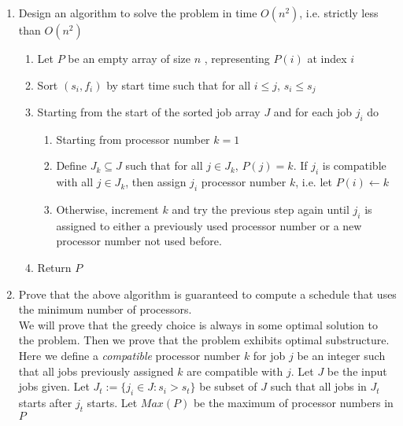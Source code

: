 \documentclass[11pt]{article}
\begin{document}
\begin{enumerate}
  \item Design an algorithm to solve the problem in time $O(n^2)$, i.e. strictly less than $O(n^2)$\\
  \begin{enumerate}
    \item Let $P$ be an empty array of size $n$ , representing $P(i)$ at index $i$
    \item Sort $(s_i, f_i)$ by start time such that for all $i\leq j$, $s_i \leq s_j$
    \item Starting from the start of the sorted job array $J$ and for each job $j_i$ do
    \begin{enumerate}
      \item Starting from processor number $k = 1$
      \item Define $J_k\subseteq J$ such that for all $j\in J_k$, $P(j) = k$. If $j_i$ is compatible with all $j\in J_k$, then assign $j_i$ processor number $k$, i.e. let $P(i) \leftarrow k$
      \item Otherwise, increment $k$ and try the previous step again until $j_i$ is assigned to either a previously used processor number or a new processor number not used before.
    \end{enumerate}
    \item Return $P$
  \end{enumerate}

  \item Prove that the above algorithm is guaranteed to compute a schedule that uses the minimum number of processors.\\

  We will prove that the greedy choice is always in some optimal solution to the problem. Then we prove that the problem exhibits optimal substructure. Here we define a \textit{compatible} processor number $k$ for job $j$ be an integer such that all jobs previously assigned $k$ are compatible with $j$. Let $J$ be the input jobs given. Let $J_t := \{ j_i \in J: s_i > s_t\}$ be subset of $J$ such that all jobs in $J_t$ starts after $j_t$ starts. Let $Max(P)$ be the maximum of processor numbers in $P$



\end{enumerate}
\end{document}

